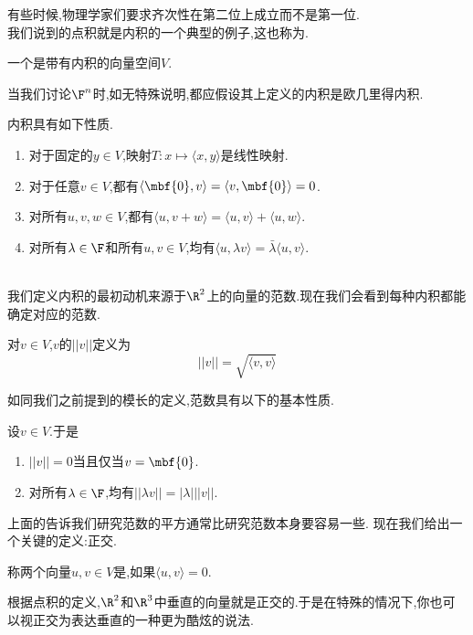\documentclass{ctexart}
\begin{document}
有些时候,物理学家们要求齐次性在第二位上成立而不是第一位.\\
我们说到的点积就是内积的一个典型的例子,这也称为.
\begin{definition}[1.3 定义:内积空间]
    一个是带有内积的向量空间$V$.
\end{definition}\noindent
当我们讨论$\F^n$时,如无特殊说明,都应假设其上定义的内积是欧几里得内积.
\begin{formal}[1.4 内积的性质]
    内积具有如下性质.
    \begin{enumerate}[label=\tbf{(\arabic*)}]
        \item 对于固定的$y\in V$,映射$T:x\mapsto \langle x,y\rangle$是线性映射.
        \item 对于任意$v\in V$,都有$\langle\mbf{0},v\rangle=\langle v,\mbf{0}\rangle=0$.
        \item 对所有$u,v,w\in V$,都有$\langle u,v+w\rangle=\langle u,v\rangle+\langle u,w\rangle$.
        \item 对所有$\lambda\in\F$和所有$u,v\in V$,均有$\langle u,\lambda v\rangle=\bar{\lambda}\langle u,v\rangle$.
    \end{enumerate}
\end{formal}\noindent
{}\\
我们定义内积的最初动机来源于$\R^2$上的向量的范数.现在我们会看到每种内积都能确定对应的范数.
\begin{definition}[2.1 定义:范数]
    对$v\in V$,$v$的$||v||$定义为
    $$||v||=\sqrt{\langle v,v\rangle}$$
\end{definition}\noindent
如同我们之前提到的模长的定义,范数具有以下的基本性质.
\begin{formal}[2.2 范数的基本性质]
    设$v\in V$.于是
    \begin{enumerate}[label=\tbf{(\arabic*)}]
        \item $||v||=0$当且仅当$v=\mbf{0}$.
        \item 对所有$\lambda\in\F$,均有$||\lambda v||=|\lambda|||v||$.
    \end{enumerate}
\end{formal}\noindent
上面的告诉我们研究范数的平方通常比研究范数本身要容易一些.
现在我们给出一个关键的定义:正交.
\begin{definition}[2.3 定义:正交]
    称两个向量$u,v\in V$是,如果$\langle u,v\rangle=0$.
\end{definition}\noindent
根据点积的定义,$\R^2$和$\R^3$中垂直的向量就是正交的.于是在特殊的情况下,你也可以视正交为表达垂直的一种更为酷炫的说法.
\end{document}
